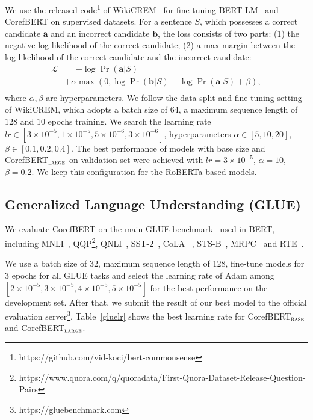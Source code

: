 \documentclass[11pt,a4paper]{article}
\newcommand\CorefBERT{CorefBERT\xspace}
\newcommand\BASESIZE{$_{\small \textsc{base}}$\xspace}
\newcommand\LARGESIZE{$_{\small \textsc{large}}$\xspace}
\begin{document}
We use the released code\footnote{https://github.com/vid-koci/bert-commonsense} of WikiCREM~\citep{wikicrem} for fine-tuning BERT-LM~\citep{ASimpleMethodforCommonsenseReasoning} and \CorefBERT on supervised datasets. For a sentence $S$, which possesses a correct candidate $\mathbf{a}$ and an incorrect candidate $\mathbf{b}$, the loss consists of two parts: (1) the negative log-likelihood of the correct candidate; (2) a max-margin between the log-likelihood of the correct candidate and the incorrect candidate:
\begin{equation}
\begin{split}
    \mathcal{L} &= - \log \Pr(\mathbf{a}|S) \\
    & + \alpha\max\left(0, \log \Pr(\mathbf{b}|S) - \log \Pr(\mathbf{a}|S) + \beta\right), \\
\end{split}
\end{equation}
where $\alpha, \beta$ are hyperparameters. We follow the data split and fine-tuning setting of WikiCREM, which adopts a batch size of 64, a  maximum sequence length of $128$ and $10$ epochs training. We search the learning rate $lr \in [3\times10^{-5}, 1\times10^{-5}, 5\times10^{-6}, 3\times10^{-6}]$, hyperparameters $\alpha\in [5,10,20]$, $\beta \in [0.1,0.2,0.4]$. The best performance of models with base size and CorefBERT\LARGESIZE on validation set were achieved with $lr=3\times10^{-5}$, $\alpha=10$, $\beta=0.2$. We keep this configuration for the RoBERTa-based models.

\subsection{Generalized Language Understanding (GLUE)}


We evaluate \CorefBERT on the main GLUE benchmark~\citep{GLUE} used in BERT, including MNLI~\citep{MNLI}, QQP\footnote{https://www.quora.com/q/quoradata/First-Quora-Dataset-Release-Question-Pairs}, QNLI~\citep{rajpurkar2016squad}, SST-2~\citep{SST-2}, CoLA~\citep{CoLA} ,  STS-B~\citep{STS-B}, MRPC~\citep{MRPC} and RTE~\citep{RTE}.

We use a batch size of $32$, maximum sequence length of 128,  fine-tune models for $3$ epochs for all GLUE tasks and select the learning rate of Adam among $[2\times10^{-5}, 3\times10^{-5}, 4\times10^{-5}, 5\times10^{-5}]$ for the best performance on the development set. After that, we submit the result of our best model to the official evaluation server\footnote{https://gluebenchmark.com}. Table~\ref{gluelr} shows the best learning rate  for CorefBERT\BASESIZE and CorefBERT\LARGESIZE.
\end{document}

